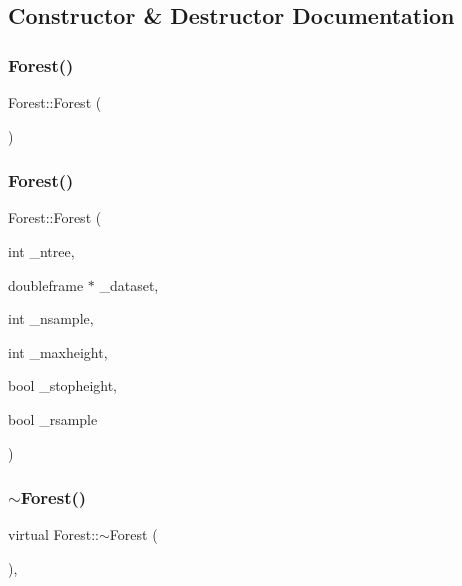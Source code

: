 \subsection{Constructor \& Destructor Documentation}
\mbox{\label{classForest_af9ad2787ae306cb4da8d7443da124d15}} 
\subsubsection{\texorpdfstring{Forest()}{Forest()}\hspace{0.1cm}{\footnotesize\ttfamily [1/2]}}
{\footnotesize\ttfamily Forest\+::\+Forest (\begin{DoxyParamCaption}{ }\end{DoxyParamCaption})\hspace{0.3cm}{\ttfamily [inline]}}

\mbox{\label{classForest_ab5be587f4e0768155c39a9bc8484bc57}} 
\subsubsection{\texorpdfstring{Forest()}{Forest()}\hspace{0.1cm}{\footnotesize\ttfamily [2/2]}}
{\footnotesize\ttfamily Forest\+::\+Forest (\begin{DoxyParamCaption}\item[{int}]{\+\_\+ntree,  }\item[{doubleframe $\ast$}]{\+\_\+dataset,  }\item[{int}]{\+\_\+nsample,  }\item[{int}]{\+\_\+maxheight,  }\item[{bool}]{\+\_\+stopheight,  }\item[{bool}]{\+\_\+rsample }\end{DoxyParamCaption})\hspace{0.3cm}{\ttfamily [inline]}}

\mbox{\label{classForest_a5ae182b3027fb3be4f1f5c76388ea211}} 
\subsubsection{\texorpdfstring{$\sim$\+Forest()}{~Forest()}}
{\footnotesize\ttfamily virtual Forest\+::$\sim$\+Forest (\begin{DoxyParamCaption}{ }\end{DoxyParamCaption})\hspace{0.3cm}{\ttfamily [virtual]}, {\ttfamily [default]}}



